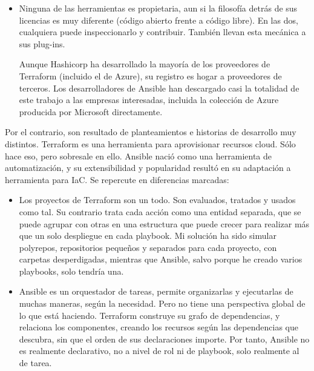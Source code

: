 \documentclass[11pt]{article}
\begin{document}
\begin{flushleft}
\begin{itemize}
            \item Ninguna de las herramientas es propietaria, aun si la filosofía detrás de sus licencias es muy diferente (código abierto frente a código libre). En las dos, cualquiera puede inspeccionarlo y contribuir. También llevan esta mecánica a sus plug-ins. 
            \linebreak
            
            Aunque Hashicorp ha desarrollado la mayoría de los proveedores de Terraform (incluido el de Azure), su registro es hogar a proveedores de terceros. Los desarrolladores de Ansible han descargado casi la totalidad de este trabajo a las empresas interesadas, incluida la colección de Azure producida por Microsoft directamente.
            \linebreak
		\end{itemize}

Por el contrario, son resultado de planteamientos e historias de desarrollo muy distintos. Terraform es una herramienta para aprovisionar recursos cloud. Sólo hace eso, pero sobresale en ello. Ansible nació como una herramienta de automatización, y su extensibilidad y popularidad resultó en su adaptación a herramienta para IaC. Se repercute en diferencias marcadas:
\skip
        \begin{itemize}
			\itemsep0em 
			\item Los proyectos de Terraform son un todo. Son evaluados, tratados y usados como tal. Su contrario trata cada acción como una entidad separada, que se puede agrupar con otras en una estructura que puede crecer para realizar más que un solo despliegue en cada playbook. Mi solución ha sido simular polyrepos, repositorios pequeños y separados para cada proyecto, con carpetas desperdigadas, mientras que Ansible, salvo porque he creado varios playbooks, solo tendría una.
            \linebreak
            
            \item Ansible es un orquestador de tareas, permite organizarlas y ejecutarlas de muchas maneras, según la necesidad. Pero no tiene una perspectiva global de lo que está haciendo. Terraform construye su grafo de dependencias, y relaciona los componentes, creando los recursos según las dependencias que descubra, sin que el orden de sus declaraciones importe. Por tanto, Ansible no es realmente declarativo, no a nivel de rol ni de playbook, solo realmente al de tarea.
            \linebreak
            

\end{itemize}
\end{flushleft}
\end{document}
